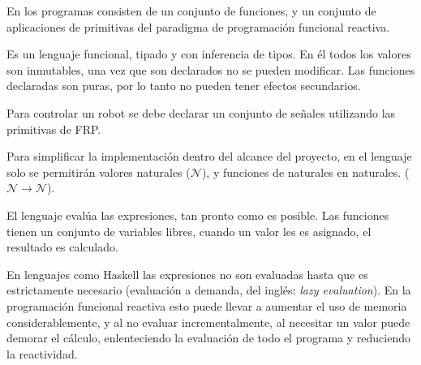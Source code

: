   En \frob{} los programas consisten de un conjunto de funciones, y un
conjunto de aplicaciones de primitivas del paradigma de programación
funcional reactiva.
  
  Es un lenguaje funcional, tipado y con inferencia de tipos.
  En él todos los valores son inmutables, una vez que son declarados
no se pueden modificar.
  Las funciones declaradas son puras, por lo tanto no pueden tener efectos
secundarios.

  Para controlar un robot se debe declarar un conjunto de señales utilizando
las primitivas de FRP.

  Para simplificar la implementación dentro del alcance del proyecto,
en el lenguaje solo se permitirán valores
naturales ($\mathcal{N}$), y funciones de naturales en naturales.
($\mathcal{N} \rightarrow \mathcal{N}$).

  El lenguaje evalúa las expresiones, tan pronto como es posible. Las
funciones tienen un conjunto de variables libres, cuando un valor les es
asignado, el resultado es calculado.
  
  En lenguajes como Haskell las expresiones no son evaluadas hasta que es
estrictamente necesario (evaluación a demanda,
del inglés: \emph{lazy evaluation}). En la programación funcional reactiva
esto puede llevar a aumentar el uso de memoria considerablemente, y al no
evaluar incrementalmente, al necesitar un valor puede demorar el cálculo,
enlenteciendo la evaluación de todo el programa y reduciendo la reactividad.


